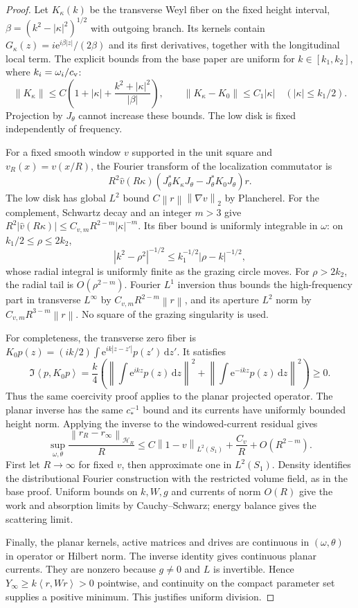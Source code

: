 \documentclass[11pt]{article}
\newcommand{\norm}[1]{\left\lVert#1\right\rVert}
\newcommand{\abs}[1]{\left|#1\right|}
\newcommand{\ip}[2]{\left\langle#1,#2\right\rangle}
\newcommand{\dd}{\,\mathrm d}
\newcommand{\ee}{\mathrm e}
\begin{document}
\begin{proof}
Let $K_\kappa(k)$ be the transverse Weyl fiber on the fixed height interval,
$\beta=(k^2-\abs\kappa^2)^{1/2}$ with outgoing branch. Its kernels contain
$G_\kappa(z)=i\ee^{i\beta\abs z}/(2\beta)$ and its first derivatives, together
with the longitudinal local term. The explicit bounds from the base paper
are uniform for $k\in[k_1,k_2]$, where $k_i=\omega_i/c_{\rm v}$:
\[
 \norm{K_\kappa}\le C\left(1+\abs\kappa+
              \frac{k^2+\abs\kappa^2}{\abs\beta}\right),\qquad
 \norm{K_\kappa-K_0}\le C_1\abs\kappa
 \quad(\abs\kappa\le k_1/2).
\]
Projection by $J_\theta$ cannot increase these bounds. The low disk is fixed
independently of frequency.

For a fixed smooth window $v$ supported in the unit square and
$v_R(x)=v(x/R)$, the Fourier transform of the localization commutator is
\[
 R^2\widehat v(R\kappa)
 (J_\theta^*K_\kappa J_\theta-J_\theta^*K_0J_\theta)r.
\]
The low disk has global $L^2$ bound $C\norm r\norm{\nabla v}_2$ by Plancherel.
For the complement, Schwartz decay and an integer $m>3$ give
$R^2\abs{\widehat v(R\kappa)}\le C_{v,m}R^{2-m}\abs\kappa^{-m}$.
Its fiber bound is uniformly integrable in $\omega$: on
$k_1/2\le\rho\le2k_2$,
\[
 \abs{k^2-\rho^2}^{-1/2}
 \le k_1^{-1/2}\abs{\rho-k}^{-1/2},
\]
whose radial integral is uniformly finite as the grazing circle moves.
For $\rho>2k_2$, the radial tail is $O(\rho^{2-m})$.
Fourier $L^1$ inversion thus bounds the high-frequency part in transverse
$L^\infty$ by $C_{v,m}R^{2-m}\norm r$, and its aperture $L^2$ norm by
$C_{v,m}R^{3-m}\norm r$. No square of the grazing singularity is used.

For completeness, the transverse zero fiber is
$K_0p(z)=(ik/2)\int\ee^{ik\abs{z-z'}}p(z')\dd z'$. It satisfies
\[
 \Im\ip p{K_0p}=\frac{k}{4}\left(
 \norm{\int\ee^{ikz}p(z)\dd z}^2+
 \norm{\int\ee^{-ikz}p(z)\dd z}^2\right)\ge0.
\]
Thus the same coercivity proof applies to the planar projected operator.
The planar inverse has the same $c_*^{-1}$ bound and its currents have uniformly
bounded height norm. Applying the inverse to the windowed-current residual
gives
\[
 \sup_{\omega,\theta}
 \frac{\norm{r_R-r_\infty}_{\mathcal H_R}}R
 \le C\norm{1-v}_{L^2(S_1)}
       +\frac{C_v}{R}+O(R^{2-m}).
\]
First let $R\to\infty$ for fixed $v$, then approximate one in $L^2(S_1)$.
Density identifies the distributional Fourier construction with the restricted
volume field, as in the base proof. Uniform bounds on $k,W,g$ and currents
of norm $O(R)$ give the work and absorption limits by Cauchy--Schwarz;
energy balance gives the scattering limit.

Finally, the planar kernels, active matrices and drives are continuous in
$(\omega,\theta)$ in operator or Hilbert norm. The inverse identity gives
continuous planar currents. They are nonzero because $g\ne0$ and $L$ is
invertible. Hence $Y_\infty\ge k\ip r{Wr}>0$ pointwise, and continuity on
the compact parameter set supplies a positive minimum. This justifies
uniform division.
\end{proof}
\end{document}
